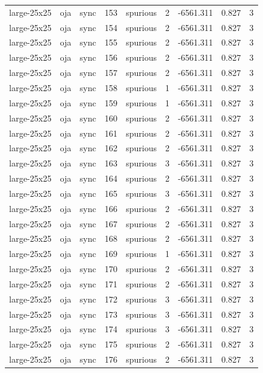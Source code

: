 \begin{tabular}{lllrlrrrr}
large-25x25 & oja & sync & 153 & spurious & 2 & -6561.311 & 0.827 & 3 \\
large-25x25 & oja & sync & 154 & spurious & 2 & -6561.311 & 0.827 & 3 \\
large-25x25 & oja & sync & 155 & spurious & 2 & -6561.311 & 0.827 & 3 \\
large-25x25 & oja & sync & 156 & spurious & 2 & -6561.311 & 0.827 & 3 \\
large-25x25 & oja & sync & 157 & spurious & 2 & -6561.311 & 0.827 & 3 \\
large-25x25 & oja & sync & 158 & spurious & 1 & -6561.311 & 0.827 & 3 \\
large-25x25 & oja & sync & 159 & spurious & 1 & -6561.311 & 0.827 & 3 \\
large-25x25 & oja & sync & 160 & spurious & 2 & -6561.311 & 0.827 & 3 \\
large-25x25 & oja & sync & 161 & spurious & 2 & -6561.311 & 0.827 & 3 \\
large-25x25 & oja & sync & 162 & spurious & 2 & -6561.311 & 0.827 & 3 \\
large-25x25 & oja & sync & 163 & spurious & 3 & -6561.311 & 0.827 & 3 \\
large-25x25 & oja & sync & 164 & spurious & 2 & -6561.311 & 0.827 & 3 \\
large-25x25 & oja & sync & 165 & spurious & 3 & -6561.311 & 0.827 & 3 \\
large-25x25 & oja & sync & 166 & spurious & 2 & -6561.311 & 0.827 & 3 \\
large-25x25 & oja & sync & 167 & spurious & 2 & -6561.311 & 0.827 & 3 \\
large-25x25 & oja & sync & 168 & spurious & 2 & -6561.311 & 0.827 & 3 \\
large-25x25 & oja & sync & 169 & spurious & 1 & -6561.311 & 0.827 & 3 \\
large-25x25 & oja & sync & 170 & spurious & 2 & -6561.311 & 0.827 & 3 \\
large-25x25 & oja & sync & 171 & spurious & 2 & -6561.311 & 0.827 & 3 \\
large-25x25 & oja & sync & 172 & spurious & 3 & -6561.311 & 0.827 & 3 \\
large-25x25 & oja & sync & 173 & spurious & 3 & -6561.311 & 0.827 & 3 \\
large-25x25 & oja & sync & 174 & spurious & 3 & -6561.311 & 0.827 & 3 \\
large-25x25 & oja & sync & 175 & spurious & 2 & -6561.311 & 0.827 & 3 \\
large-25x25 & oja & sync & 176 & spurious & 2 & -6561.311 & 0.827 & 3 \\

\end{tabular}
